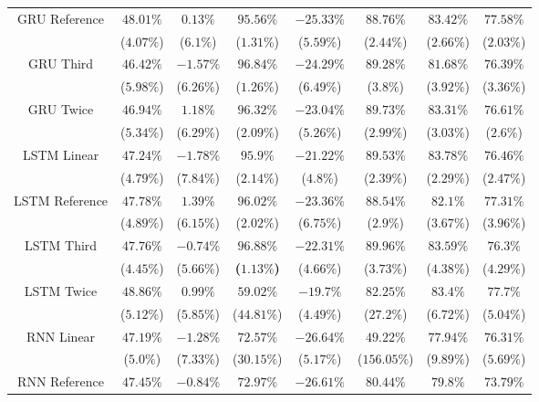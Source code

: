 \begin{table}[!ht]
{\begin{tabular}{|c|c|c|c|c|c|c|c|}
			\multirow{2}{*}{GRU Reference} & $48.01\%$ & $0.13\%$ & $95.56\%$ & $-25.33\%$ & $88.76\%$ & $83.42\%$ & $77.58\%$ \\
			 & ($4.07\%$) & ($6.1\%$) & ($1.31\%$) & ($5.59\%$) & ($2.44\%$) & ($2.66\%$) & ($2.03\%$) \\ \hline
			\multirow{2}{*}{GRU Third} & $46.42\%$ & $-1.57\%$ & $96.84\%$ & $-24.29\%$ & $89.28\%$ & $81.68\%$ & $76.39\%$ \\
			 & ($5.98\%$) & ($6.26\%$) & ($1.26\%$) & ($6.49\%$) & ($3.8\%$) & ($3.92\%$) & ($3.36\%$) \\ \hline
			\multirow{2}{*}{GRU Twice} & $46.94\%$ & $1.18\%$ & $96.32\%$ & $-23.04\%$ & $89.73\%$ & $83.31\%$ & $76.61\%$ \\
			 & ($5.34\%$) & ($6.29\%$) & ($2.09\%$) & ($5.26\%$) & ($2.99\%$) & ($3.03\%$) & ($2.6\%$) \\ \hline
			\multirow{2}{*}{LSTM Linear} & $47.24\%$ & $-1.78\%$ & $95.9\%$ & $-21.22\%$ & $89.53\%$ & $83.78\%$ & $76.46\%$ \\
			 & ($4.79\%$) & ($7.84\%$) & ($2.14\%$) & ($4.8\%$) & ($2.39\%$) & ($2.29\%$) & ($2.47\%$) \\ \hline
			\multirow{2}{*}{LSTM Reference} & $47.78\%$ & $1.39\%$ & $96.02\%$ & $-23.36\%$ & $88.54\%$ & $82.1\%$ & $77.31\%$ \\
			 & ($4.89\%$) & ($6.15\%$) & ($2.02\%$) & ($6.75\%$) & ($2.9\%$) & ($3.67\%$) & ($3.96\%$) \\ \hline
			\multirow{2}{*}{LSTM Third} & $47.76\%$ & $-0.74\%$ & $\mathbf{96.88\%}$ & $-22.31\%$ & $89.96\%$ & $83.59\%$ & $76.3\%$ \\
			 & ($4.45\%$) & ($5.66\%$) & \textbf{(}$\mathbf{1.13\%}$\textbf{)} & ($4.66\%$) & ($3.73\%$) & ($4.38\%$) & ($4.29\%$) \\ \hline
			\multirow{2}{*}{LSTM Twice} & $48.86\%$ & $0.99\%$ & $59.02\%$ & $-19.7\%$ & $82.25\%$ & $83.4\%$ & $77.7\%$ \\
			 & ($5.12\%$) & ($5.85\%$) & ($44.81\%$) & ($4.49\%$) & ($27.2\%$) & ($6.72\%$) & ($5.04\%$) \\ \hline
			\multirow{2}{*}{RNN Linear} & $47.19\%$ & $-1.28\%$ & $72.57\%$ & $-26.64\%$ & $49.22\%$ & $77.94\%$ & $76.31\%$ \\
			 & ($5.0\%$) & ($7.33\%$) & ($30.15\%$) & ($5.17\%$) & ($156.05\%$) & ($9.89\%$) & ($5.69\%$) \\ \hline
			\multirow{2}{*}{RNN Reference} & $47.45\%$ & $-0.84\%$ & $72.97\%$ & $-26.61\%$ & $80.44\%$ & $79.8\%$ & $73.79\%$ \\

\end{tabular}}
\end{table}
